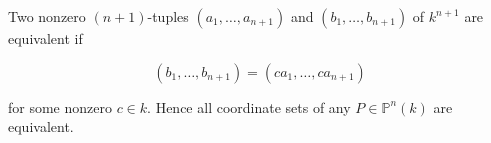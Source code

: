 Two nonzero $(n+1)$-tuples $(a_1, \ldots, a_{n+1})$ and $(b_1, \ldots, b_{n+1})$ of $k^{n+1}$ are equivalent if

$$(b_1, \ldots, b_{n+1}) = (c a_1, \ldots, c a_{n+1})$$

for some nonzero $c \in k$. Hence all coordinate sets of any $P \in \mathbb{P}^n(k)$ are equivalent.
